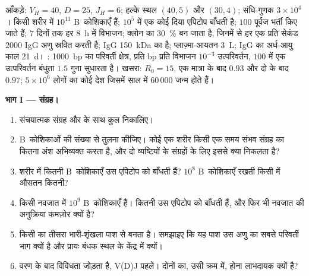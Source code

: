 \begin{problem}
\label{pb:b3:adaptive-immunity:1}
आँकड़े: $V_{H} = 40$, $D = 25$, $J_{H} = 6$; हल्के स्थल $(40, 5)$ और
$(30, 4)$; संधि-गुणक $3\times 10^{4}$। किसी शरीर में $10^{11}$
B~कोशिकाएँ हैं; $10^{5}$ में एक कोई दिया एपिटोप बाँधती है; $100$
पूर्वज भर्ती किए जाते हैं; $7$ दिनों तक हर \qty{8}{h} में विभाजन;
क्लोन का \qty{30}{\%}  बन जाता है, जिनमें से हर एक
प्रति सेकंड $2000$ IgG अणु स्रवित करती है; IgG \qty{150}{kDa} का है;
प्लाज़्मा-आयतन \qty{3}{L}; IgG का अर्ध-आयु काल \qty{21}{d}।
: \qty{1000}{bp} का परिवर्ती क्षेत्र, प्रति bp प्रति विभाजन
$10^{-3}$ उत्परिवर्तन, $100$ में एक उत्परिवर्तन बंधुता $1.5$ गुना
सुधारता है। खसरा: $R_{0} = 15$,  एक मात्रा के बाद $0.93$
और दो के बाद $0.97$; $5\times 10^{6}$ लोगों का कोई देश जिसमें साल में
$60\,000$ जन्म होते हैं।

\medskip
\noindent\textbf{भाग I --- संग्रह।}
\begin{enumerate}
  \item संचयात्मक संग्रह और  के साथ कुल निकालिए।
  \item B~कोशिकाओं की संख्या से तुलना कीजिए। कोई एक शरीर किसी एक समय
        संभव संग्रह का कितना अंश अभिव्यक्त करता है, और दो व्यष्टियों के
        संग्रहों के लिए इससे क्या निकलता है?
  \item शरीर में कितनी B~कोशिकाएँ उस एपिटोप को बाँधती हैं? $10^{8}$
        B~कोशिकाएँ रखती किसी  में औसतन कितनी?
  \item किसी नवजात में $10^{9}$ B~कोशिकाएँ हैं। कितनी उस एपिटोप को
        बाँधती हैं, और फिर भी नवजात की अनुक्रिया कमज़ोर क्यों है?
  \item किसी  का तीसरा भारी-शृंखला पाश  से बनता
        है। समझाइए कि यह पाश उस अणु का सबसे परिवर्ती भाग क्यों है और
        प्रायः बंधक स्थल के केंद्र में क्यों।
  \item {} वरण के बाद विविधता जोड़ता है, V(D)J पहले।
        दोनों का, उसी क्रम में, होना लाभदायक क्यों है?
\end{enumerate}


\end{problem}
